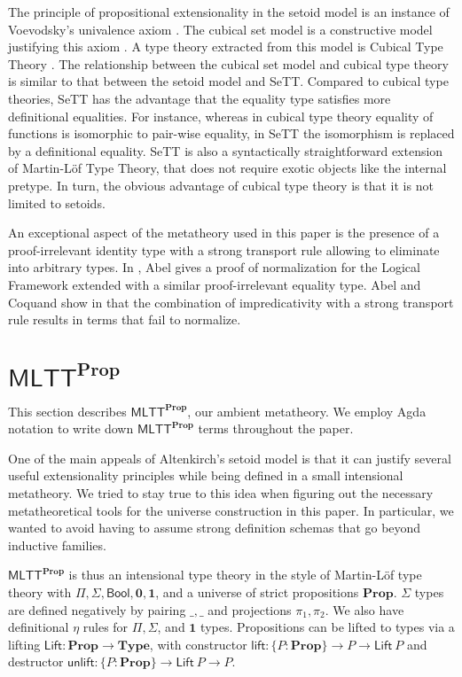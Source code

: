 \documentclass{easychair}
\newcommand{\mlttp}{\textsf{MLTT}^{\mProp}}
\newcommand{\mType}{\mathbf{Type}}
\newcommand{\mProp}{\mathbf{Prop}}
\begin{document}
The principle of propositional extensionality in the setoid model is an instance
of Voevodsky's univalence axiom \cite{hottbook}. The cubical set model is a
constructive model justifying this axiom \cite{cubical-sets}. A type theory
extracted from this model is Cubical Type Theory \cite{cubical}. The
relationship between the cubical set model and cubical type theory is similar to
that between the setoid model and SeTT.
%
Compared to cubical type theories, SeTT has the advantage that the equality type
satisfies more definitional equalities. For instance, whereas in cubical type
theory equality of functions is isomorphic to pair-wise equality, in SeTT the
isomorphism is replaced by a definitional equality. SeTT is also a syntactically
straightforward extension of Martin-L\"of Type Theory, that does not require
exotic objects like the internal pretype. In turn, the obvious advantage of
cubical type theory is that it is not limited to setoids.

An exceptional aspect of the metatheory used in this paper is the presence of a
proof-irrelevant identity type with a strong transport rule allowing to
eliminate into arbitrary types.
%
In \cite{abel:nbe09}, Abel gives a proof of normalization for the
Logical Framework extended with a similar proof-irrelevant equality type.
%
Abel and Coquand show in \cite{abel2019failure} that the combination of
impredicativity with a strong transport rule results in terms that fail to
normalize.

\section{$\mlttp$}\label{sec:metatheory}

This section describes $\mlttp$, our ambient metatheory. We employ Agda notation
to write down $\mlttp$ terms throughout the paper.

One of the main appeals of Altenkirch's setoid model is that it can justify
several useful extensionality principles while being defined in a small
intensional metatheory.
%
We tried to stay true to this idea when figuring out the necessary
metatheoretical tools for the universe construction in this paper. In
particular, we wanted to avoid having to assume strong definition schemas that
go beyond inductive families.

$\mlttp$ is thus an intensional type theory in the style of Martin-L\"of type
theory with $\Pi, \Sigma, \textsf{Bool}, \mathbf{0}, \mathbf{1}$, and a universe
of strict propositions $\mProp$. $\Sigma$ types are defined negatively by
pairing $\_,\_$ and projections $\pi_1, \pi_2$. We also have definitional $\eta$
rules for $\Pi, \Sigma$, and $\mathbf{1}$ types. Propositions can be lifted to
types via a lifting $\textsf{Lift} : \mProp \to \mType$, with constructor
$\textsf{lift} : \{P : \mProp \} \to P \to \textsf{Lift}\ P$ and destructor
$\textsf{unlift} : \{P : \mProp \} \to \textsf{Lift}\ P \to P$.
\end{document}
